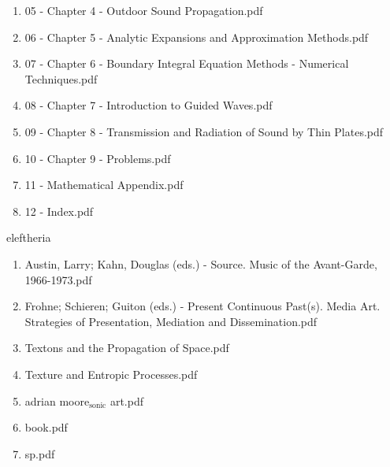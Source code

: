 \documentclass[11pt]{article}
\begin{document}
\begin{enumerate}
\begin{enumerate}
\item 05 - Chapter 4 - Outdoor Sound Propagation.pdf
\label{sec-1-1-1-1-11-19-23-27-6}

\item 06 - Chapter 5 - Analytic Expansions and Approximation Methods.pdf
\label{sec-1-1-1-1-11-19-23-27-7}

\item 07 - Chapter 6 - Boundary Integral Equation Methods - Numerical Techniques.pdf
\label{sec-1-1-1-1-11-19-23-27-8}

\item 08 - Chapter 7 - Introduction to Guided Waves.pdf
\label{sec-1-1-1-1-11-19-23-27-9}

\item 09 - Chapter 8 - Transmission and Radiation of Sound by Thin Plates.pdf
\label{sec-1-1-1-1-11-19-23-27-10}

\item 10 - Chapter 9 - Problems.pdf
\label{sec-1-1-1-1-11-19-23-27-11}

\item 11 - Mathematical Appendix.pdf
\label{sec-1-1-1-1-11-19-23-27-12}

\item 12 - Index.pdf
\label{sec-1-1-1-1-11-19-23-27-13}
\end{enumerate}
\end{enumerate}

\item eleftheria
\label{sec-1-1-1-1-11-19-24}
\begin{enumerate}
\item Austin, Larry; Kahn, Douglas (eds.) - Source. Music of the Avant-Garde, 1966-1973.pdf
\label{sec-1-1-1-1-11-19-24-1}

\item Frohne; Schieren; Guiton (eds.) - Present Continuous Past(s). Media Art. Strategies of Presentation, Mediation and Dissemination.pdf
\label{sec-1-1-1-1-11-19-24-2}

\item Textons and the Propagation of Space.pdf
\label{sec-1-1-1-1-11-19-24-3}

\item Texture and Entropic Processes.pdf
\label{sec-1-1-1-1-11-19-24-4}

\item adrian moore$_{\text{sonic}}$ art.pdf
\label{sec-1-1-1-1-11-19-24-5}

\item book.pdf
\label{sec-1-1-1-1-11-19-24-6}

\item sp.pdf
\label{sec-1-1-1-1-11-19-24-7}
\end{enumerate}
\end{document}

